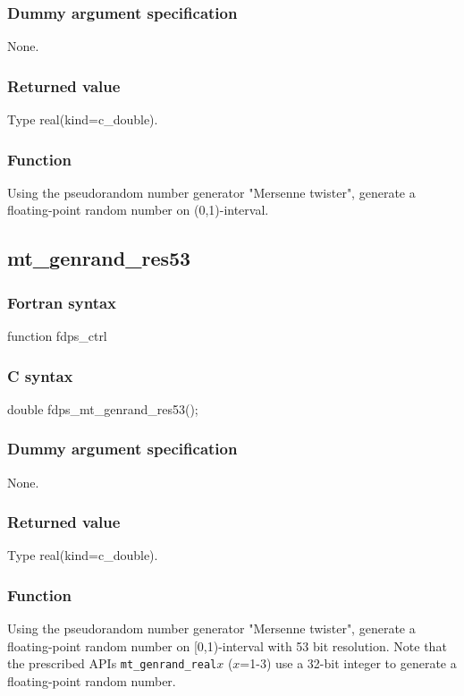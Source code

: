 \subsubsection*{Dummy argument specification}
None.

\subsubsection*{Returned value}
Type real(kind=c\_double).

\subsubsection*{Function}
Using the pseudorandom number generator "Mersenne twister", generate a floating-point random number on (0,1)-interval.
\clearpage

\subsection{mt\_genrand\_res53}
\subsubsection*{Fortran syntax}
\begin{screen}
\begin{spverbatim}
function fdps_ctrl%
\end{spverbatim}
\end{screen}

\subsubsection*{C syntax}
\begin{screen}
\begin{spverbatim}
double fdps_mt_genrand_res53();
\end{spverbatim}
\end{screen}

\subsubsection*{Dummy argument specification}
None.

\subsubsection*{Returned value}
Type real(kind=c\_double).

\subsubsection*{Function}
Using the pseudorandom number generator "Mersenne twister", generate a floating-point random number on [0,1)-interval with 53 bit resolution. Note that the prescribed APIs \verb|mt_genrand_real|$x$ ($x$=1-3) use a 32-bit integer to generate a floating-point random number.
\clearpage








